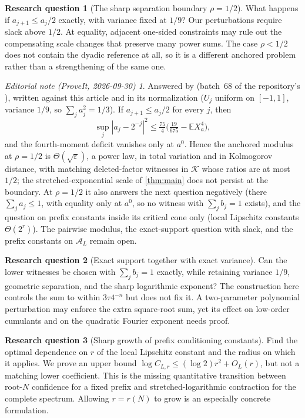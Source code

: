 \documentclass[11pt,a4paper]{article}
\numberwithin{equation}{section}
\theoremstyle{definition}
\newtheorem{question}{Research question}
\theoremstyle{remark}
\newtheorem*{ednotelater}{Editorial note (ProveIt, 2026-09-30)}
\newcommand{\E}{\mathbb E}
\newcommand{\A}{\mathcal A}
\newcommand{\K}{\mathcal K}
\newcommand{\eps}{\varepsilon}
\begin{document}
\begin{question}[The sharp separation boundary $\rho=1/2$]
What happens if $a_{j+1}\le a_j/2$ exactly, with variance fixed at $1/9$?
Our perturbations require slack above $1/2$. At equality, adjacent one-sided
constraints may rule out the compensating scale changes that preserve many
power sums. The case $\rho<1/2$ does not contain the dyadic reference at all,
so it is a different anchored problem rather than a strengthening of the
same one.
\end{question}
\begin{ednotelater}
Answered by 
(batch~68 of the repository's ), written against this
article and in its normalization ($U_j$ uniform on $[-1,1]$, variance
$1/9$, so $\sum_ja_j^2=1/3$). If $a_{j+1}\le a_j/2$ for every $j$, then
\[
 \sup_j|a_j-2^{-j}|^2\le\tfrac{75}{4}\bigl(\tfrac{19}{675}-\E X_a^4\bigr),
\]
and the fourth-moment deficit vanishes only at $a^0$. Hence the anchored
modulus at $\rho=1/2$ is $\Theta(\sqrt\eps)$, a power law, in total
variation and in Kolmogorov distance, with matching deleted-factor
witnesses in $\K$ whose ratios are at most $1/2$; the
stretched-exponential scale of \cref{thm:main} does not persist at the
boundary. At $\rho=1/2$ it also answers the next question negatively
(there $\sum_ja_j\le1$, with equality only at $a^0$, so no witness with
$\sum_jb_j=1$ exists), and the question on prefix constants inside its
critical cone only (local Lipschitz constants $\Theta(2^r)$). The pairwise
modulus, the exact-support question with slack, and the prefix constants
on $\A_L$ remain open.
\end{ednotelater}

\begin{question}[Exact support together with exact variance]
Can the lower witnesses be chosen with $\sum_jb_j=1$ exactly, while
retaining variance $1/9$, geometric separation, and the sharp logarithmic
exponent? The construction here controls the sum to within $3\tau4^{-n}$
but does not fix it. A two-parameter polynomial perturbation may enforce
the extra square-root sum, yet its effect on low-order cumulants and on the
quadratic Fourier exponent needs proof.
\end{question}

\begin{question}[Sharp growth of prefix conditioning constants]
Find the optimal dependence on $r$ of the local Lipschitz constant and the
radius on which it applies. We prove an upper bound
$\log C_{L,r}\le(\log2)r^2+O_L(r)$, but not a matching lower coefficient.
This is the missing quantitative transition between root-$N$ confidence
for a fixed prefix and stretched-logarithmic contraction for the complete
spectrum. Allowing $r=r(N)$ to grow is an especially concrete formulation.
\end{question}
\end{document}
